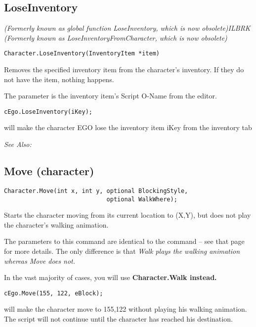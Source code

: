 \subsection{LoseInventory}\label{Character.LoseInventory}%

\it{(Formerly known as global function LoseInventory, which is now obsolete)}ILBRK
\it{(Formerly known as LoseInventoryFromCharacter, which is now obsolete)}

\begin{verbatim}
Character.LoseInventory(InventoryItem *item)
\end{verbatim}
Removes the specified inventory item from the character's inventory.
If they do not have the item, nothing happens.

The parameter is the inventory item's Script O-Name from the editor.

\begin{verbatim}
cEgo.LoseInventory(iKey);
\end{verbatim}
will make the character EGO lose the inventory item iKey from the inventory tab

\it{See Also:} 


\subsection{Move (character)}\label{Character.Move}%

\begin{verbatim}
Character.Move(int x, int y, optional BlockingStyle,
                             optional WalkWhere);
\end{verbatim}
Starts the character moving from its current location to (X,Y), but does
not play the character's walking animation.

The parameters to this command are identical to the 
command -- see that page for more details. The only difference is that \it{Walk}
plays the walking animation whereas \it{Move} does not.

In the vast majority of cases, you will use \bf{Character.Walk} instead.

\begin{verbatim}
cEgo.Move(155, 122, eBlock);
\end{verbatim}
will make the character move to 155,122 without playing his walking animation.
The script will not continue until the character has reached his destination.

